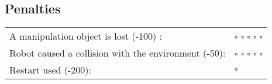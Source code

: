 \begin{flushleft}

\subsection*{Penalties}

\begin{tabular}{ l l}
	A manipulation object is lost (-100) : & $\square$ $\square$ $\square$ $\square$ $\square$ \\ 
	Robot caused a collision with the environment (-50): & $\square$ $\square$ $\square$ $\square$ $\square$ \\
	Restart used (-200): & $\square$ \\
\end{tabular}
\end{flushleft}
